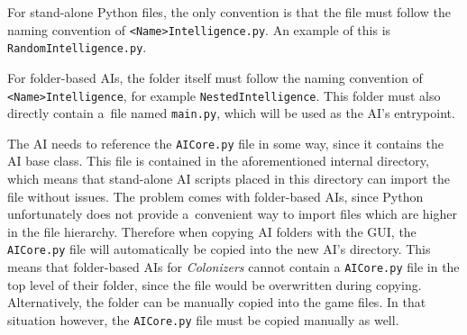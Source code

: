 For stand-alone Python files, the only convention is that the file must follow the naming
convention of \texttt{<Name>Intelligence.py}. An example of this
is \texttt{RandomIntelligence.py}.

For folder-based AIs, the folder itself must follow the naming convention of
\texttt{<Name>Intelligence}, for example \texttt{NestedIntelligence}. This
folder must also directly contain a~file named \texttt{main.py}, which will
be used as the AI's entrypoint.

The AI needs to reference the \texttt{AICore.py}
file in some way, since it contains the AI base class. This file is contained in
the aforementioned internal directory, which means that stand-alone AI scripts
placed in this directory can import the file without issues. The problem comes
with folder-based AIs, since Python unfortunately does not provide a~convenient way
to import files which are higher in the file hierarchy. Therefore when copying
AI folders with the GUI, the \texttt{AICore.py} file will automatically be copied
into the new AI's directory. This means that folder-based AIs for \emph{Colonizers}
cannot contain a \texttt{AICore.py} file in the top level of their folder,
since the file would be overwritten during copying. Alternatively, the folder
can be manually copied into the game files. In that situation however, the
\texttt{AICore.py} file must be copied manually as well.
